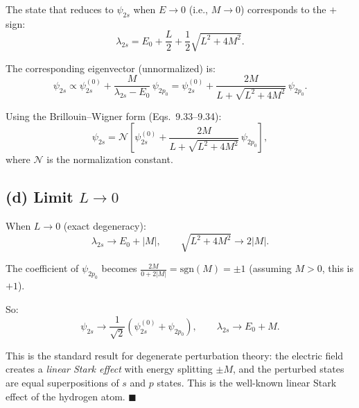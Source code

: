 \documentclass[12pt]{article}
\begin{document}
The state that reduces to $\psi_{2s}$ when $E \to 0$ (i.e., $M \to 0$) corresponds to the $+$ sign:
\[
\boxed{\lambda_{2s} = E_0 + \frac{L}{2} + \frac{1}{2}\sqrt{L^2 + 4M^2}}.
\]

The corresponding eigenvector (unnormalized) is:
\[
\psi_{2s} \propto \psi_{2s}^{(0)} + \frac{M}{\lambda_{2s} - E_0}\,\psi_{2p_0} = \psi_{2s}^{(0)} + \frac{2M}{L + \sqrt{L^2 + 4M^2}}\,\psi_{2p_0}.
\]

Using the Brillouin--Wigner form (Eqs.~9.33--9.34):
\[
\boxed{\psi_{2s} = \mathcal{N}\left[\psi_{2s}^{(0)} + \frac{2M}{L + \sqrt{L^2 + 4M^2}}\,\psi_{2p_0}\right]},
\]
where $\mathcal{N}$ is the normalization constant.

\subsection*{(d) Limit $L \to 0$}

When $L \to 0$ (exact degeneracy):
\[
\lambda_{2s} \to E_0 + |M|, \qquad \sqrt{L^2 + 4M^2} \to 2|M|.
\]

The coefficient of $\psi_{2p_0}$ becomes $\frac{2M}{0 + 2|M|} = \text{sgn}(M) = \pm 1$ (assuming $M > 0$, this is $+1$).

So:
\[
\psi_{2s} \to \frac{1}{\sqrt{2}}(\psi_{2s}^{(0)} + \psi_{2p_0}), \qquad \lambda_{2s} \to E_0 + M.
\]

This is the standard result for degenerate perturbation theory: the electric field creates a \emph{linear Stark effect} with energy splitting $\pm M$, and the perturbed states are equal superpositions of $s$ and $p$ states. This is the well-known linear Stark effect of the hydrogen atom. \hfill $\blacksquare$
\end{document}

